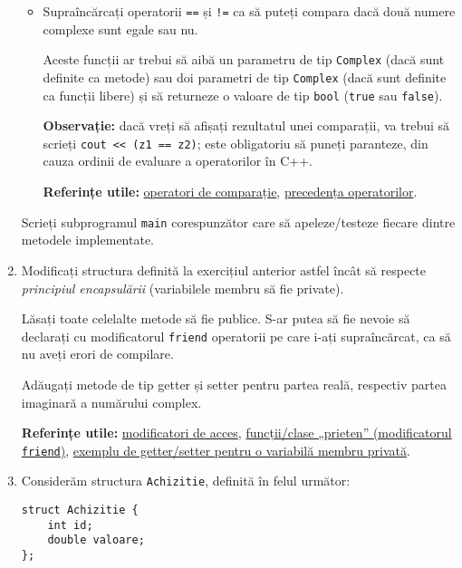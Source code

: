 \begin{enumerate}
\begin{itemize}
        \item Supraîncărcați operatorii \texttt{==} și \texttt{!=} ca să puteți compara dacă două numere complexe sunt egale sau nu.

        Aceste funcții ar trebui să aibă un parametru de tip \texttt{Complex} (dacă sunt definite ca metode) sau doi parametri de tip \texttt{Complex} (dacă sunt definite ca funcții libere) și să returneze o valoare de tip \texttt{bool} (\texttt{true} sau \texttt{false}).

        \textbf{Observație:} dacă vreți să afișați rezultatul unei comparații, va trebui să scrieți \texttt{cout << (z1 == z2)}; este obligatoriu să puneți paranteze, din cauza ordinii de evaluare a operatorilor în C++.

        \textbf{Referințe utile:} \href{https://en.cppreference.com/w/cpp/language/operator_comparison}{operatori de comparație}, \href{https://en.cppreference.com/w/cpp/language/operator_precedence}{precedența operatorilor}.
    \end{itemize}

    Scrieți subprogramul \texttt{main} corespunzător care să apeleze/testeze fiecare dintre metodele implementate.

    \item Modificați structura definită la exercițiul anterior astfel încât să respecte \emph{principiul encapsulării} (variabilele membru să fie private).
    
    Lăsați toate celelalte metode să fie publice. S-ar putea să fie nevoie să declarați cu modificatorul \texttt{friend} operatorii pe care i-ați supraîncărcat, ca să nu aveți erori de compilare.

    Adăugați metode de tip getter și setter pentru partea reală, respectiv partea imaginară a numărului complex.

    \textbf{Referințe utile:} 
    \href{https://www.tutorialspoint.com/cplusplus/cpp_class_access_modifiers.htm}{modificatori de acces}, \href{https://www.geeksforgeeks.org/friend-class-function-cpp/}{funcții/clase „prieten” (modificatorul \texttt{friend})}, \href{https://www.w3schools.com/cpp/cpp_encapsulation.asp}{exemplu de getter/setter pentru o variabilă membru privată}.

    \item Considerăm structura \texttt{Achizitie}, definită în felul următor:
    \begin{lstlisting}
struct Achizitie {
    int id;
    double valoare;
};
    \end{lstlisting}


\end{enumerate}
